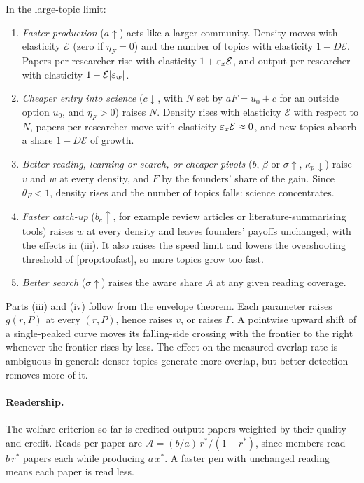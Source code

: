 \begin{proposition}\label{prop:ai}
In the large-topic limit:
\begin{enumerate}[label=(\roman*)]
\item \emph{Faster production} ($a\uparrow$) acts like a larger community. Density moves with elasticity $\mathcal E$ (zero if $\eta_F=0$) and the number of topics with elasticity $1-D\mathcal E$. Papers per researcher rise with elasticity $1+\varepsilon_x\mathcal E$, and output per researcher with elasticity $1-\mathcal E|\varepsilon_w|$.
\item \emph{Cheaper entry into science} ($c\downarrow$, with $N$ set by $aF=u_0+c$ for an outside option $u_0$, and $\eta_F>0$) raises $N$. Density rises with elasticity $\mathcal E$ with respect to $N$, papers per researcher move with elasticity $\varepsilon_x\mathcal E\approx 0$, and new topics absorb a share $1-D\mathcal E$ of growth.
\item \emph{Better reading, learning or search, or cheaper pivots} ($b$, $\beta$ or $\sigma\uparrow$, $\kappa_p\downarrow$) raise $v$ and $w$ at every density, and $F$ by the founders' share of the gain. Since $\theta_F<1$, density rises and the number of topics falls: science concentrates.
\item \emph{Faster catch-up} ($b_c\uparrow$, for example review articles or literature-summarising tools) raises $w$ at every density and leaves founders' payoffs unchanged, with the effects in (iii). It also raises the speed limit and lowers the overshooting threshold of \cref{prop:toofast}, so more topics grow too fast.
\item \emph{Better search} ($\sigma\uparrow$) raises the aware share $A$ at any given reading coverage.
\end{enumerate}
\end{proposition}

Parts (iii) and (iv) follow from the envelope theorem. Each parameter raises
$g(r,P)$ at every $(r,P)$, hence raises $v$, or raises $\Gamma$. A pointwise
upward shift of a single-peaked curve moves its falling-side crossing with the
frontier to the right whenever the frontier rises by less. The effect on the
measured overlap rate is ambiguous in general: denser topics generate more
overlap, but better detection removes more of it.

\paragraph{Readership.} The welfare criterion so far is credited output:
papers weighted by their quality and credit. Reads per paper are
$\mathcal A=(b/a)\,r^*/(1-r^*)$, since members read $b\,r^*$ papers each
while producing $a\,x^*$. A faster pen with unchanged reading means each paper
is read less.

